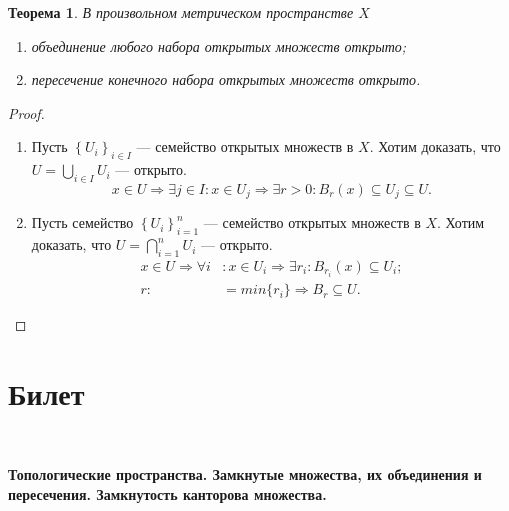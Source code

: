 \documentclass[a4paper,100pt]{article}
\theoremstyle{indented}
\newtheorem{theorem}{Теорема}
\begin{document}
\begin{itemize}
\begin{theorem}
    В произвольном метрическом пространстве $X$ 
    \begin{enumerate}
        \item объединение любого набора открытых множеств открыто;
        \item пересечение конечного набора открытых множеств открыто.
    \end{enumerate}
    \end{theorem}
    \begin{proof}
    \
    \begin{enumerate}
        \item Пусть $\left\{U_i\right\}_{i \in I}$ --- семейство открытых множеств в $X$.
        Хотим доказать, что $U = \bigcup_{i \in I}U_i$ --- открыто.
        \[
            x \in U \Rightarrow \exists j \in I : x \in U_j \Rightarrow \exists r > 0: B_r(x) \subseteq U_j \subseteq U.
        \]
        \item
        Пусть семейство $\left\{U_i\right\}_{i=1}^n$ --- семейство открытых множеств в $X$.
        Хотим доказать, что $U = \bigcap_{i=1}^n U_i$ --- открыто.
        \[
            \begin{aligned}
        x \in U \Rightarrow \forall i&: x \in U_i \Rightarrow \exists r_i: B_{r_i} (x) \subseteq U_i; \\ 
        r :&= min\{r_i\} \Rightarrow B_r \subseteq U.
            \end{aligned}
        \]
    \end{enumerate}
    \end{proof}
    \end{itemize}



  
\section{Билет} \

\medskip 

\textbf{Топологические пространства. Замкнутые множества, их объединения и пересечения. Замкнутость канторова множества.}\\
\end{document}
